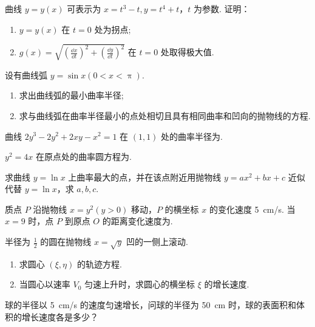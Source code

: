 	\begin{ti}
		曲线 $y = y(x)$ 可表示为 $x = t^{3} - t, y = t^{4} + t$，$t$ 为参数. 证明：
		\begin{enumerate}
			\item $y = y(x)$ 在 $t = 0$ 处为拐点;
			\item $g(x) = \sqrt{\left( \frac{\dd{x}}{\dd{t}} \right)^{2} + \left( \frac{\dd{y}}{\dd{t}} \right)^{2}}$ 在 $t = 0$ 处取得极大值.
		\end{enumerate}
	\end{ti}

	\begin{ti}
		设有曲线弧 $y = \sin x(0 < x < \uppi)$.
		\begin{enumerate}
			\item 求出曲线弧的最小曲率半径;
			\item 求与曲线弧在曲率半径最小的点处相切且具有相同曲率和凹向的抛物线的方程.
		\end{enumerate}
	\end{ti}

	\begin{ti}
		曲线 $2y^{3} - 2y^{2} + 2xy - x^{2} = 1$ 在 $(1,1)$ 处的曲率半径为.
	\end{ti}

	\begin{ti}
		$y^{2} = 4x$ 在原点处的曲率圆方程为\hone{4}.
	\end{ti}

	\begin{ti}
		求曲线 $y = \ln x$ 上曲率最大的点，并在该点附近用抛物线 $y = ax^{2} + bx + c$ 近似代替 $y = \ln x$，求 $a,b,c$.
	\end{ti}

	\begin{ti}
		质点 $P$ 沿抛物线 $x = y^{2}(y > 0)$ 移动，$P$ 的横坐标 $x$ 的变化速度 \SI{5}{cm/s}. 当 $x = 9$ 时，点 $P$ 到原点 $O$ 的距离变化速度为.
	\end{ti}

	\begin{ti}
		半径为 $\frac{1}{2}$ 的圆在抛物线 $x = \sqrt{y}$ 凹的一侧上滚动.
		\begin{enumerate}
			\item 求圆心 $(\xi,\eta)$ 的轨迹方程.
			\item 当圆心以速率 $V_{0}$ 匀速上升时，求圆心的横坐标 $\xi$ 的增长速度.
		\end{enumerate}
	\end{ti}

	\begin{ti}
		球的半径以 \SI{5}{cm/s} 的速度匀速增长，问球的半径为 \SI{50}{cm} 时，球的表面积和体积的增长速度各是多少？
	\end{ti}